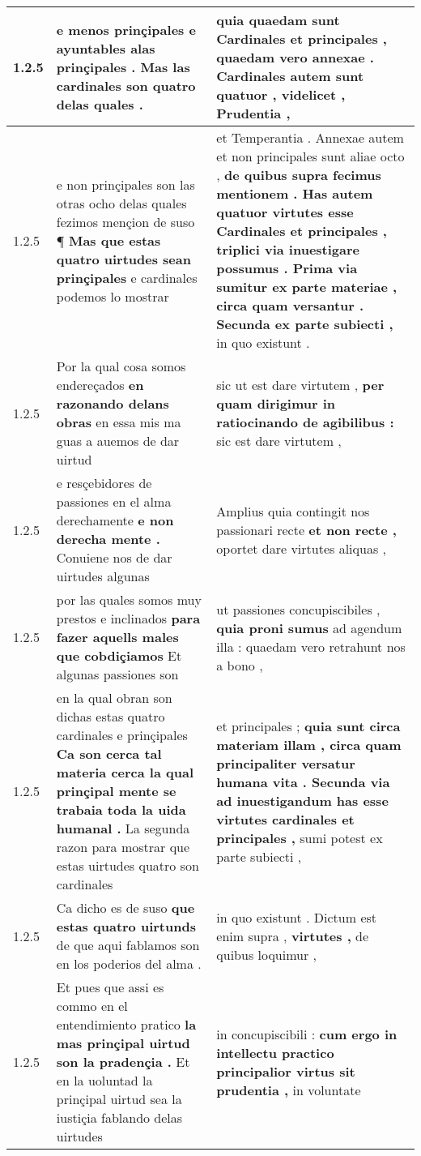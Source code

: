 \begin{tabular}{|p{1cm}|p{6.5cm}|p{6.5cm}|}
1.2.5 & e menos prinçipales \textbf{ e ayuntables alas prinçipales . } Mas las cardinales son quatro delas quales . & quia quaedam sunt Cardinales et principales , \textbf{ quaedam vero annexae . Cardinales autem sunt quatuor , } videlicet , Prudentia , \\\hline
1.2.5 & e non prinçipales son las otras ocho delas quales fezimos mençion de suso ¶ \textbf{ Mas que estas quatro uirtudes sean prinçipales } e cardinales podemos lo mostrar & et Temperantia . Annexae autem et non principales sunt aliae octo , \textbf{ de quibus supra fecimus mentionem . Has autem quatuor virtutes esse Cardinales et principales , triplici via inuestigare possumus . Prima via sumitur ex parte materiae , circa quam versantur . Secunda ex parte subiecti , } in quo existunt . \\\hline
1.2.5 & Por la qual cosa somos endereçados \textbf{ en razonando delans obras } en essa mis ma guas a auemos de dar uirtud & sic ut est dare virtutem , \textbf{ per quam dirigimur in ratiocinando de agibilibus : } sic est dare virtutem , \\\hline
1.2.5 & e resçebidores de passiones en el alma derechamente \textbf{ e non derecha mente . } Conuiene nos de dar uirtudes algunas & Amplius quia contingit nos passionari recte \textbf{ et non recte , } oportet dare virtutes aliquas , \\\hline
1.2.5 & por las quales somos muy prestos e inclinados \textbf{ para fazer aquells males que cobdiçiamos } Et algunas passiones son & ut passiones concupiscibiles , \textbf{ quia proni sumus } ad agendum illa : quaedam vero retrahunt nos a bono , \\\hline
1.2.5 & en la qual obran son dichas estas quatro cardinales e prinçipales \textbf{ Ca son cerca tal materia cerca la qual prinçipal mente se trabaia toda la uida humanal . } La segunda razon para mostrar que estas uirtudes quatro son cardinales & et principales ; \textbf{ quia sunt circa materiam illam , circa quam principaliter versatur humana vita . Secunda via ad inuestigandum has esse virtutes cardinales et principales , } sumi potest ex parte subiecti , \\\hline
1.2.5 & Ca dicho es de suso \textbf{ que estas quatro uirtunds } de que aqui fablamos son en los poderios del alma . & in quo existunt . Dictum est enim supra , \textbf{ virtutes , } de quibus loquimur , \\\hline
1.2.5 & Et pues que assi es commo en el entendimiento pratico \textbf{ la mas prinçipal uirtud son la pradençia . } Et en la uoluntad la prinçipal uirtud sea la iustiçia fablando delas uirtudes & in concupiscibili : \textbf{ cum ergo in intellectu practico principalior virtus sit prudentia , } in voluntate \\\hline

\end{tabular}
